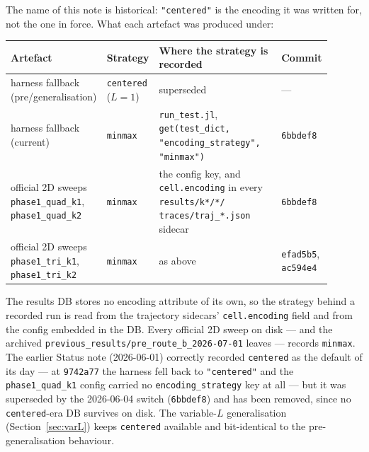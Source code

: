 \documentclass[11pt]{article}
\newcommand{\code}[1]{\texttt{#1}}
\begin{document}
The name of this note is historical: \code{"centered"} is the encoding it was
written for, not the one in force. What each artefact was produced under:

\begin{center}
\footnotesize
\setlength{\tabcolsep}{4pt}
\begin{tabular}{@{}p{0.24\linewidth}p{0.13\linewidth}p{0.38\linewidth}p{0.15\linewidth}@{}}
\toprule
Artefact & Strategy & Where the strategy is recorded & Commit \\
\midrule
harness fallback (pre\-/generalisation) & \code{centered} ($L=1$) & superseded & --- \\
harness fallback (current) & \code{minmax} & \code{run\_test.jl}, \code{get(test\_dict,} \code{"encoding\_strategy",} \code{"minmax")} & \code{6bbdef8} \\
official 2D sweeps \code{phase1\_quad\_k1}, \code{phase1\_quad\_k2} & \code{minmax} & the config key, and \code{cell.encoding} in every \code{results/k*/*/} \code{traces/traj\_*.json} sidecar & \code{6bbdef8} \\
official 2D sweeps \code{phase1\_tri\_k1}, \code{phase1\_tri\_k2} & \code{minmax} & as above & \code{efad5b5}, \code{ac594e4} \\
\bottomrule
\end{tabular}
\end{center}

\noindent The results DB stores no encoding attribute of its own, so the
strategy behind a recorded run is read from the trajectory sidecars'
\code{cell.encoding} field and from the config embedded in the DB. Every
official 2D sweep on disk --- and the archived
\code{previous\_results/pre\_route\_b\_2026-07-01} leaves --- records
\code{minmax}. The earlier Status note (2026-06-01) correctly recorded
\code{centered} as the default of its day --- at \code{9742a77} the harness fell
back to \code{"centered"} and the \code{phase1\_quad\_k1} config carried no
\code{encoding\_strategy} key at all --- but it was superseded by the 2026-06-04
switch (\code{6bbdef8}) and has been removed, since no \code{centered}-era DB
survives on disk. The variable-$L$ generalisation
(Section~\ref{sec:varL}) keeps \code{centered} available and
bit-identical to the pre-generalisation behaviour.
\end{document}
